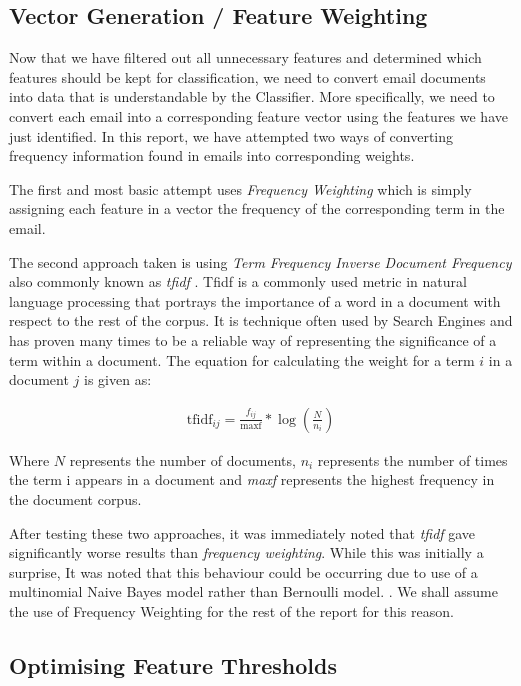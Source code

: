 \subsection{Vector Generation / Feature Weighting}

Now that we have filtered out all unnecessary features and determined which features should be kept for classification, we need to convert email documents into data that is understandable by the Classifier. More specifically, we need to convert each email into a corresponding feature vector using the features we have just identified. In this report, we have attempted two ways of converting frequency information found in emails into corresponding weights. 

The first and most basic attempt uses \emph{Frequency Weighting} which is simply assigning each feature in a vector the frequency of the corresponding term in the email. 

The second approach taken is using \emph{Term Frequency Inverse Document Frequency} also commonly known as \emph{tfidf} \cite{tfidf1973}. Tfidf is a commonly used metric in natural language processing that portrays the importance of a word in a document with respect to the rest of the corpus. It is technique often used by Search Engines and has proven many times to be a reliable way of representing the significance of a term within a document. The equation for calculating the weight for a term $i$ in a document $j$ is given as:

\begin{align*}
	\textrm{tfidf}_{ij} = \frac{f_{ij}}{\textrm{maxf}} * \log\left(\frac{N}{n_i}\right)
\end{align*}

Where $N$ represents the number of documents, $n_i$ represents the number of times the term i appears in a document and \emph{maxf} represents the highest frequency in the document corpus.

After testing these two approaches, it was immediately noted that \emph{tfidf} gave significantly worse results than \emph{frequency weighting}. While this was initially a surprise, It was noted that this behaviour could be occurring due to use of a multinomial Naive Bayes model rather than Bernoulli model. . We shall assume the use of Frequency Weighting for the rest of the report for this reason.

\subsection{Optimising Feature Thresholds}
\label{sec:featurethresholds}

